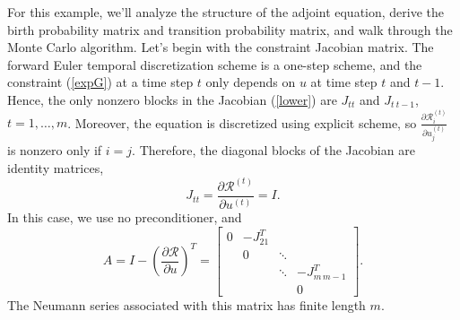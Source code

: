 \documentclass{elsart}
\theoremstyle{remark}
\theoremstyle{definition}
\theoremstyle{proof}
\begin{document}
    For this example, we'll analyze the structure of the adjoint
    equation, derive the birth probability matrix and transition
    probability matrix, and walk through the Monte Carlo algorithm.
    Let's begin with the constraint Jacobian matrix.  The
    forward Euler temporal discretization scheme is a one-step scheme,
    and the constraint (\ref{expG}) at a time step $t$ only depends on
    $u$ at time step $t$ and $t-1$.  Hence, the only nonzero blocks in
    the Jacobian (\ref{lower}) are $J_{t t}$ and $J_{t\: t-1}$,
    $t=1,\ldots,m$.  Moreover, the equation is discretized using explicit
    scheme, so $\frac{\partial \mathcal{R}_i^{(t)}}{\partial u_j^{(t)}}$ is
    nonzero only if $i=j$.  Therefore, the diagonal blocks of the
    Jacobian are identity matrices,
    $$ J_{t t} = \frac{\partial \mathcal{R}^{(t)}}{\partial u^{(t)}} = I. $$
    In this case, we use no preconditioner, and
    \[ A = I - \left( \frac{\partial \mathcal{R}}{\partial u} \right)^T =
    \begin{bmatrix}
    0        & -J_{2 1}^T &        & \\
             & 0          & \ddots & \\
             &            & \ddots & -J_{m\, m-1}^T \\
             &            &        & 0
    \end{bmatrix}. \]
    The Neumann series associated with this matrix has finite length $m$.
    
\end{document}
